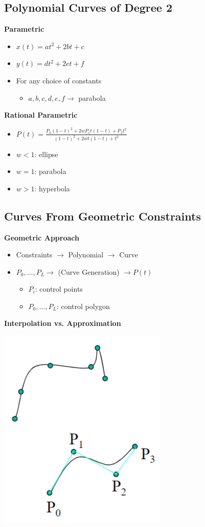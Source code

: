 \documentclass{article}
\begin{document}
\subsection*{Polynomial Curves of Degree 2}
\textbf{Parametric}
\begin{itemize}
    \item $x(t) = at^2 + 2bt + c$
    \item $y(t) = dt^2 + 2et + f$
    \item For any choice of constants
    \begin{itemize}
        \item $a, b, c, d, e, f \rightarrow$ parabola
    \end{itemize}
\end{itemize}
\textbf{Rational Parametric}
\begin{itemize}
    \item $P(t) = \frac{P_0(1 - t)^2 + 2wP_1 t(1-t) + P_2 t^2}{(1-t)^2 + 2wt(1 - t) + t^2}$
    \item $w<1$: ellipse
    \item $w=1$: parabola
    \item $w>1$: hyperbola
\end{itemize}
\subsection*{Curves From Geometric Constraints}
\textbf{Geometric Approach}
\begin{itemize}
    \item Constraints $\rightarrow$ Polynomial $\rightarrow$ Curve
    \item $P_0, \dots, P_L \rightarrow $ (Curve Generation) $\rightarrow P(t)$
    \begin{itemize}
        \item $P_i$: control points
        \item $P_0, \dots, P_L$: control polygon
    \end{itemize}
\end{itemize}
\textbf{Interpolation vs. Approximation}
\begin{center}
    \includegraphics*[scale=0.8]{W3_2.png}
\end{center}
\end{document}
